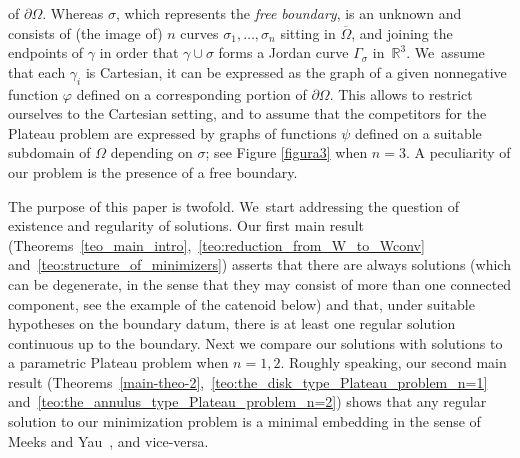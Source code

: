 \documentclass[JEP,XML,SOM,Unicode, NoFloatCountersInSection,published]{cedram}
\newcommand{\R}{\mathbb{R}}
\let\Om\Omega
\theoremstyle{definition}
\begin{document}
of $\partial \Om$.
Whereas $\sigma$, which represents
the {\it free boundary}, is an unknown and
consists of (the image of)
$n$ curves $\sigma_1,\dots,\sigma_n$
sitting in $\overline\Omega$, and
joining the endpoints of $\gamma$
in order that $\gamma\cup\sigma$ forms a Jordan curve $\Gamma_\sigma$
in~$\R^3$. We~assume that each $\gamma_i$
is Cartesian, \ie it can be expressed as the graph of a given nonnegative function $\varphi$
defined on a corresponding portion of
$\partial \Omega$. This allows to restrict ourselves
to the Cartesian setting, and to assume that the competitors
for the Plateau problem are expressed by graphs of functions $\psi$
defined on a suitable subdomain of $\Omega$ depending on $\sigma$;
see Figure \ref{figura3} when $n=3$.
A peculiarity of our problem is the presence of a free boundary.

The purpose of this paper is twofold. We~start
addressing the question of existence and regularity of solutions.
Our first main result
(Theorems~\ref{teo_main_intro},~\ref{teo:reduction_from_W_to_Wconv} and~\ref{teo:structure_of_minimizers}) asserts that there are always solutions (which can be degenerate, in the sense that they may consist of more than one connected component,
see the example of the catenoid below) and that, under suitable hypotheses on the boundary datum, there is at least one regular solution continuous up to the boundary. Next we compare our solutions with solutions to a parametric Plateau problem when $n=1,2$.
Roughly speaking, our second main result (Theorems~\ref{main-theo-2},~\ref{teo:the_disk_type_Plateau_problem_n=1} and~\ref{teo:the_annulus_type_Plateau_problem_n=2}) shows that any regular solution to our minimization problem is a minimal embedding in the sense of Meeks and Yau~\cite{MY}, and vice-versa.
\end{document}
